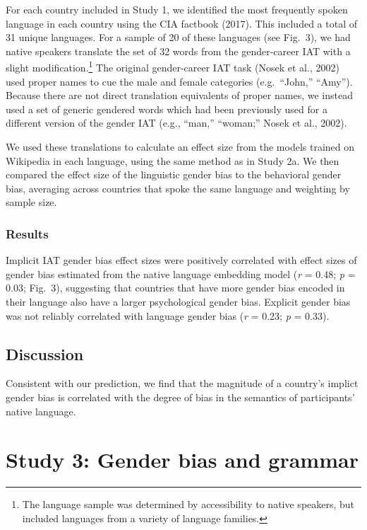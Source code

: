 \documentclass[10pt, letterpaper]{article}
\begin{document}
For each country included in Study 1, we identified the most frequently
spoken language in each country using the CIA factbook (2017). This
included a total of 31 unique languages. For a sample of 20 of these
languages (see Fig.~3), we had native speakers translate the set of 32
words from the gender-career IAT with a slight
modification.\footnote{The language sample was determined by accessibility to native speakers, but included languages from a variety of language families.}
The original gender-career IAT task (Nosek et al., 2002) used proper
names to cue the male and female categories (e.g.~``John,'' ``Amy'').
Because there are not direct translation equivalents of proper names, we
instead used a set of generic gendered words which had been previously
used for a different version of the gender IAT (e.g., ``man,''
``woman;'' Nosek et al., 2002).

We used these translations to calculate an effect size from the models
trained on Wikipedia in each language, using the same method as in Study
2a. We then compared the effect size of the linguistic gender bias to
the behavioral gender bias, averaging across countries that spoke the
same language and weighting by sample size.

\subsubsection{Results}\label{results-2}

Implicit IAT gender bias effect sizes were positively correlated with
effect sizes of gender bias estimated from the native language embedding
model (\emph{r} = 0.48; \emph{p} = 0.03; Fig.~3), suggesting that
countries that have more gender bias encoded in their language also have
a larger psychological gender bias. Explicit gender bias was not
reliably correlated with language gender bias (\emph{r} = 0.23; \emph{p}
= 0.33).

\subsection{Discussion}\label{discussion-1}

Consistent with our prediction, we find that the magnitude of a
country's implict gender bias is correlated with the degree of bias in
the semantics of participants' native language.

\section{Study 3: Gender bias and
grammar}\label{study-3-gender-bias-and-grammar}
\end{document}
